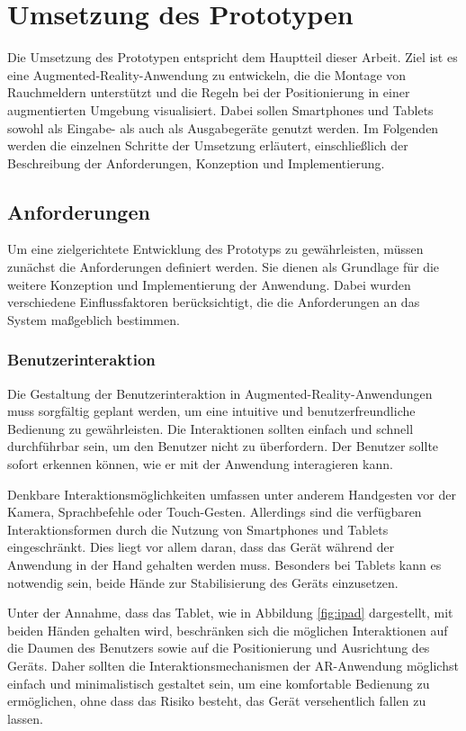 \chapter{Umsetzung des Prototypen}

Die Umsetzung des Prototypen entspricht dem Hauptteil dieser Arbeit. Ziel ist es eine Augmented-Reality-Anwendung zu entwickeln, die die Montage von Rauchmeldern unterstützt und die Regeln bei der Positionierung in einer augmentierten Umgebung visualisiert. Dabei sollen Smartphones und Tablets sowohl als Eingabe- als auch als Ausgabegeräte genutzt werden. Im Folgenden werden die einzelnen Schritte der Umsetzung erläutert, einschließlich der Beschreibung der Anforderungen, Konzeption und Implementierung.

\section{Anforderungen}\label{sec:requirements}

Um eine zielgerichtete Entwicklung des Prototyps zu gewährleisten, müssen zunächst die Anforderungen definiert werden. Sie dienen als Grundlage für die weitere Konzeption und Implementierung der Anwendung. Dabei wurden verschiedene Einflussfaktoren berücksichtigt, die die Anforderungen an das System maßgeblich bestimmen.

\subsection{Benutzerinteraktion}

Die Gestaltung der Benutzerinteraktion in Augmented-Reality-Anwendungen muss sorgfältig geplant werden, um eine intuitive und benutzerfreundliche Bedienung zu gewährleisten. Die Interaktionen sollten einfach und schnell durchführbar sein, um den Benutzer nicht zu überfordern. Der Benutzer sollte sofort erkennen können, wie er mit der Anwendung interagieren kann. 

Denkbare Interaktionsmöglichkeiten umfassen unter anderem Handgesten vor der Kamera, Sprachbefehle oder Touch-Gesten. Allerdings sind die verfügbaren Interaktionsformen durch die Nutzung von Smartphones und Tablets eingeschränkt. Dies liegt vor allem daran, dass das Gerät während der Anwendung in der Hand gehalten werden muss. Besonders bei Tablets kann es notwendig sein, beide Hände zur Stabilisierung des Geräts einzusetzen.

Unter der Annahme, dass das Tablet, wie in Abbildung \ref{fig:ipad} dargestellt, mit beiden Händen gehalten wird, beschränken sich die möglichen Interaktionen auf die Daumen des Benutzers sowie auf die Positionierung und Ausrichtung des Geräts. Daher sollten die Interaktionsmechanismen der AR-Anwendung möglichst einfach und minimalistisch gestaltet sein, um eine komfortable Bedienung zu ermöglichen, ohne dass das Risiko besteht, das Gerät versehentlich fallen zu lassen.

